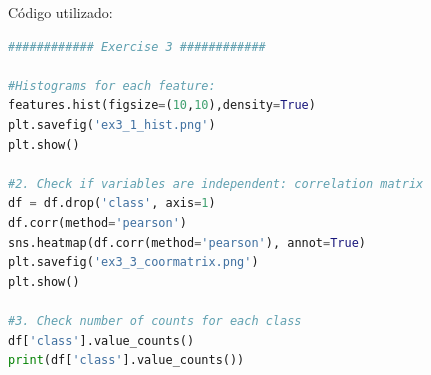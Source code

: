 \documentclass[a4paper,12pt]{article} %
\begin{document}
\begin{enumerate}
Código utilizado:
\begin{lstlisting}[language=Python]
############ Exercise 3 ############

#Histograms for each feature:
features.hist(figsize=(10,10),density=True)
plt.savefig('ex3_1_hist.png')
plt.show()

#2. Check if variables are independent: correlation matrix
df = df.drop('class', axis=1)
df.corr(method='pearson')
sns.heatmap(df.corr(method='pearson'), annot=True)
plt.savefig('ex3_3_coormatrix.png')
plt.show()

#3. Check number of counts for each class
df['class'].value_counts()
print(df['class'].value_counts())
\end{lstlisting}

\end{enumerate}
\end{document}
